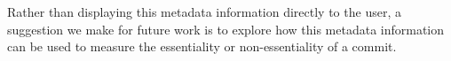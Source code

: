 Rather than displaying this metadata information directly to the user,
a suggestion we make for future work is to explore how this metadata information
can be used to measure the essentiality or non-essentiality of a commit.

\endinput

Any text after an \endinput is ignored.
You could put scraps here or things in progress.
